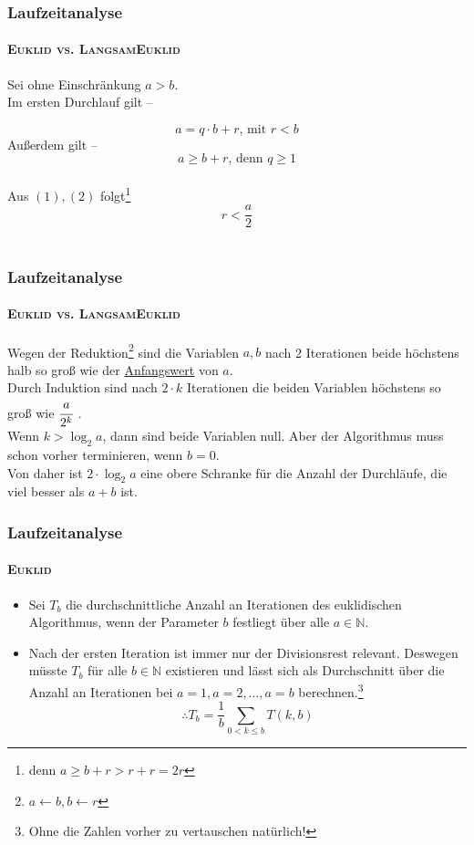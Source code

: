 \documentclass[•]{beamer}
\begin{document}
\begin{frame}
	\frametitle{Laufzeitanalyse}
	\framesubtitle{\textsc{Euklid vs. LangsamEuklid}}
	Sei ohne Einschr\"ankung $a>b$.\\ Im ersten Durchlauf gilt --
	
	\begin{equation}a = q \cdot b + r \text{, mit } r < b
	\end{equation}
	 Au{\ss}erdem gilt -- \\ \begin{equation}a \geq b + r\text{, denn }q \geq 1\end{equation} \\
	 Aus $(1), (2)$ folgt\footnote{denn $a \geq b + r > r + r = 2r$} $$r < \frac{a}{2}$$ \\
\end{frame}	
\begin{frame}
	\frametitle{Laufzeitanalyse}
	\framesubtitle{\textsc{Euklid vs. LangsamEuklid}}
	Wegen der Reduktion\footnote{$a \gets b, b \gets r$} sind die Variablen $a,b$ nach 2 Iterationen beide h\"ochstens halb so gro{\ss} wie der \underline{Anfangswert} von $a$. \\ \vspace{15pt}
	Durch Induktion sind nach $2 \cdot k$ Iterationen die beiden Variablen h\"ochstens so gro{\ss} wie $\cfrac{a}{2^k}$ .\\ \vspace{15pt}
	Wenn $k > \log_{2}a$, dann sind beide Variablen null. Aber der Algorithmus muss schon vorher terminieren, wenn $b=0$.\\ \vspace{10pt} Von daher ist $2 \cdot \log_{2}a$ eine obere Schranke f\"ur die Anzahl der Durchl\"aufe, die viel besser als $a+b$ ist.
\end{frame}

\begin{frame}
	\frametitle{Laufzeitanalyse}
	\framesubtitle{\textsc{Euklid}}
	\begin{itemize}
	\item Sei $T_{b}$ die durchschnittliche Anzahl an Iterationen des euklidischen Algorithmus, wenn der Parameter $b$ festliegt \"uber alle $a \in \mathbb{N}$.
	\item Nach der ersten Iteration ist immer nur der Divisionsrest relevant. Deswegen m\"usste $T_{b}$ f\"ur alle $b \in \mathbb{N}$ existieren und l\"asst sich als Durchschnitt \"uber die Anzahl an Iterationen bei $a=1, a=2, \dots ,a=b$ berechnen.\footnote{\scriptsize{Ohne die Zahlen vorher zu vertauschen nat\"urlich!}}
	$$\therefore T_{b} = \frac{1}{b} \sum_{0 < k\leq b} T(k,b)$$
	\end{itemize}
	\end{frame}
\end{document}
